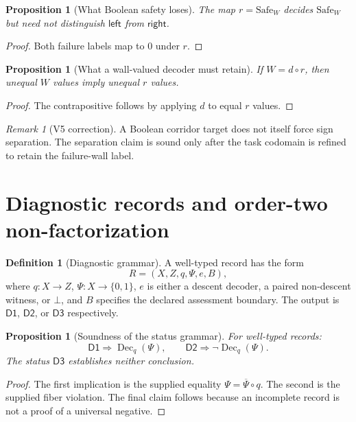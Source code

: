 \documentclass[11pt]{article}
\newcommand{\Bbits}{\ensuremath{\{0,1\}}}
\newcommand{\DOne}{\ensuremath{\mathsf{D1}}}
\newcommand{\DTwo}{\ensuremath{\mathsf{D2}}}
\newcommand{\DThree}{\ensuremath{\mathsf{D3}}}
\newcommand{\Dec}{\ensuremath{\operatorname{Dec}}}
\theoremstyle{plain}
\newtheorem{proposition}[theorem]{Proposition}
\theoremstyle{definition}
\newtheorem{definition}[theorem]{Definition}
\theoremstyle{remark}
\newtheorem{remark}[theorem]{Remark}
\begin{document}
\begin{proposition}[What Boolean safety loses]
The map $r=\mathrm{Safe}_W$ decides $\mathrm{Safe}_W$ but need not distinguish
$\mathsf{left}$ from $\mathsf{right}$.
\end{proposition}

\begin{proof}
Both failure labels map to $0$ under $r$.
\end{proof}

\begin{proposition}[What a wall-valued decoder must retain]
If $W=d\circ r$, then unequal $W$ values imply unequal $r$ values.
\end{proposition}

\begin{proof}
The contrapositive follows by applying $d$ to equal $r$ values.
\end{proof}

\begin{remark}[V5 correction]
A Boolean corridor target does not itself force sign separation.  The separation
claim is sound only after the task codomain is refined to retain the failure-wall
label.
\end{remark}

\section{Diagnostic records and order-two non-factorization}
\label{sec:binding}

\begin{definition}[Diagnostic grammar]
A well-typed record has the form
\[
R=(X,Z,q,\Psi,e,B),
\]
where $q:X\to Z$, $\Psi:X\to\Bbits$, $e$ is either a descent decoder, a paired
non-descent witness, or $\bot$, and $B$ specifies the declared assessment
boundary.  The output is $\DOne$, $\DTwo$, or $\DThree$ respectively.
\end{definition}

\begin{proposition}[Soundness of the status grammar]
For well-typed records:
\[
\DOne\Rightarrow\Dec_q(\Psi),\qquad
\DTwo\Rightarrow\neg\Dec_q(\Psi).
\]
The status $\DThree$ establishes neither conclusion.
\end{proposition}

\begin{proof}
The first implication is the supplied equality $\Psi=\overline\Psi\circ q$.
The second is the supplied fiber violation.  The final claim follows because an
incomplete record is not a proof of a universal negative.
\end{proof}
\end{document}
